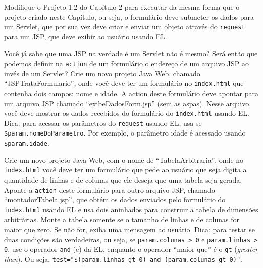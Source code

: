 \begin{projetoSemArquivo}{}{}{}
    Modifique o Projeto 1.2 do Capítulo 2 para executar da mesma forma que o projeto criado neste Capítulo, ou seja, o formulário deve submeter os dados para um Servlet, que por sua vez deve criar e enviar um objeto através do \texttt{request} para um JSP, que deve exibir ao usuário usando EL.
\end{projetoSemArquivo}

\begin{projetoSemArquivo}{}{}{}
    Você já sabe que uma JSP na verdade é um Servlet não é mesmo? Será então que podemos definir na \texttt{action} de um formulário o endereço de um arquivo JSP ao invés de um Servlet? Crie um novo projeto Java Web, chamado ``JSPTrataFormulario'', onde você deve ter um formulário no \texttt{index.html} que contenha dois campos: nome e idade. A action deste formulário deve apontar para um arquivo JSP chamado ``exibeDadosForm.jsp'' (sem as aspas). Nesse arquivo, você deve mostrar os dados recebidos do formulário do \texttt{index.html} usando EL. Dica: para acessar os parâmetros do \texttt{request} usando EL, usa-se \texttt{\${param.nomeDoParametro}}. Por exemplo, o parâmetro idade é acessado usando \texttt{\${param.idade}}.
\end{projetoSemArquivo}

\begin{projetoSemArquivo}{}{}{}
    Crie um novo projeto Java Web, com o nome de ``TabelaArbitraria'', onde no \texttt{index.html} você deve ter um formulário que pede ao usuário que seja digita a quantidade de linhas e de colunas que ele deseja que uma tabela seja gerada. Aponte a \texttt{action} deste formulário para outro arquivo JSP, chamado ``montadorTabela.jsp'', que obtém os dados enviados pelo formulário do \texttt{index.html} usando EL e usa dois  aninhados para construir a tabela de dimensões arbitrárias. Monte a tabela somente se o tamanho de linhas e de colunas for maior que zero. Se não for, exiba uma mensagem ao usuário. Dica: para testar se duas condições são verdadeiras, ou seja, se \texttt{param.colunas > 0} e \texttt{param.linhas > 0}, use o operador \texttt{and} (e) da EL, enquanto o operador ``maior que'' é o \texttt{gt} (\textit{greater than}). Ou seja, \texttt{test="\${(param.linhas gt 0) and (param.colunas gt 0)}"}.
\end{projetoSemArquivo}